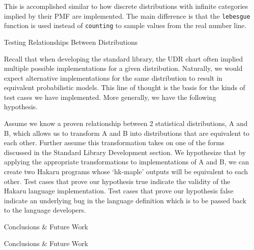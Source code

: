 \documentclass[22pt]{beamer}
\newenvironment{variableblock}[3]{%
  \setbeamercolor{block body}{#2}
  \setbeamercolor{block title}{#3}
  \begin{block}{#1}}{\end{block}}
\begin{document}
\begin{frame}[fragile]
\begin{textblock}{5}
\begin{variableblock}{}{}{}
\bigskip

\tiny{This is accomplished similar to how discrete distributions with infinite categories implied by their PMF are implemented. The main difference is that the {\tt \tiny{lebesgue}} function is used instead of {\tt \tiny{counting}} to sample values from the real number line.}


\end{variableblock}


\begin{block}{Testing Relationships Between Distributions}
\justifying

\tiny{Recall that when developing the standard library, the UDR chart often implied multiple possible implementations for a given distribution. Naturally, we would expect alternative implementations for the same distribution to result in equivalent probabilistic models. This line of thought is the basis for the kinds of test cases we have implemented. More generally, we have the following hypothesis.}

\bigskip

\tiny{Assume we know a proven relationship between 2 statistical distributions, A and B, which allows us to transform A and B into distributions that are equivalent to each other. Further assume this transformation takes on one of the forms discussed in the Standard Library Development section. We hypothesize that by applying the appropriate transformations to implementations of A and B, we can create two Hakaru programs whose `hk-maple' outputs will be equivalent to each other. Test cases that prove our hypothesis true indicate the validity of the Hakaru language implementation. Test cases that prove our hypothesis false indicate an underlying bug in the language definition which is to be passed back to the language developers.
}

\end{block}


\begin{block}{Conclusions \& Future Work}

Conclusions \& Future Work


\end{block}
\end{textblock}
\end{frame}
\end{document}
